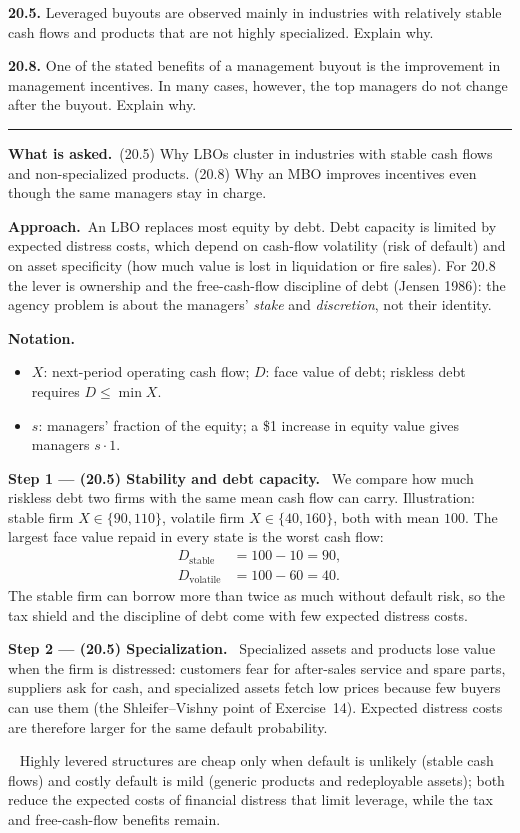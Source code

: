 \documentclass[11pt,a4paper]{article}
\newcommand{\notation}{\par\noindent\textbf{Notation.}}
\newcommand{\step}[2]{\par\medskip\noindent\textbf{Step #1 --- #2.}~}
\newcommand{\asked}{\par\medskip\noindent\textbf{What is asked.}~}
\newcommand{\approach}{\par\smallskip\noindent\textbf{Approach.}~}
\newcommand{\answer}[1]{\par\smallskip\noindent\fbox{\textbf{Answer #1.}}~}
\newcommand{\stmtend}{\par\endgroup\nopagebreak\noindent\rule{\linewidth}{0.4pt}\par\medskip}
\begin{document}
\textbf{20.5.} Leveraged buyouts are observed mainly in industries with relatively stable cash flows
and products that are not highly specialized. Explain why.

\textbf{20.8.} One of the stated benefits of a management buyout is the improvement in management
incentives. In many cases, however, the top managers do not change after the buyout. Explain why.
\stmtend

\asked (20.5) Why LBOs cluster in industries with stable cash flows and non-specialized products.
(20.8) Why an MBO improves incentives even though the same managers stay in charge.

\approach An LBO replaces most equity by debt. Debt capacity is limited by expected distress costs,
which depend on cash-flow volatility (risk of default) and on asset specificity (how much value is lost
in liquidation or fire sales). For 20.8 the lever is ownership and the free-cash-flow discipline of
debt (Jensen 1986): the agency problem is about the managers' \emph{stake} and \emph{discretion}, not
their identity.

\notation
\begin{itemize}
  \item $X$: next-period operating cash flow; $D$: face value of debt; riskless debt requires $D\le \min X$.
  \item $s$: managers' fraction of the equity; a \$1 increase in equity value gives managers $s\cdot 1$.
\end{itemize}

\step{1}{(20.5) Stability and debt capacity} We compare how much riskless debt two firms with the same
mean cash flow can carry. Illustration: stable firm $X\in\{90,110\}$, volatile firm $X\in\{40,160\}$,
both with mean $100$. The largest face value repaid in every state is the worst cash flow:
\begin{align}
  D_{\text{stable}} &= 100-10=90, \nonumber\\
  D_{\text{volatile}} &= 100-60=40. \nonumber
\end{align}
The stable firm can borrow more than twice as much without default risk, so the tax shield and the
discipline of debt come with few expected distress costs.

\step{2}{(20.5) Specialization} Specialized assets and products lose value when the firm is distressed:
customers fear for after-sales service and spare parts, suppliers ask for cash, and specialized
assets fetch low prices because few buyers can use them (the Shleifer--Vishny point of Exercise~14).
Expected distress costs are therefore larger for the same default probability.
\answer{(20.5)} Highly levered structures are cheap only when default is unlikely (stable cash flows)
and costly default is mild (generic products and redeployable assets); both reduce the expected costs
of financial distress that limit leverage, while the tax and free-cash-flow benefits remain.
\end{document}
